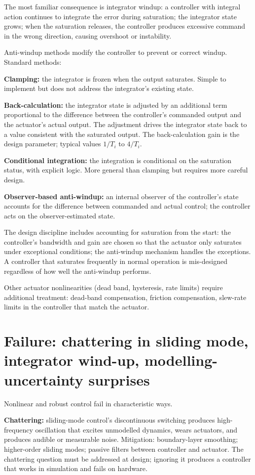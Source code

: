 The most familiar consequence is integrator windup: a controller with integral action continues to integrate the error during saturation; the integrator state grows; when the saturation releases, the controller produces excessive command in the wrong direction, causing overshoot or instability.

Anti-windup methods modify the controller to prevent or correct windup. Standard methods:

\textbf{Clamping:} the integrator is frozen when the output saturates. Simple to implement but does not address the integrator's existing state.

\textbf{Back-calculation:} the integrator state is adjusted by an additional term proportional to the difference between the controller's commanded output and the actuator's actual output. The adjustment drives the integrator state back to a value consistent with the saturated output. The back-calculation gain is the design parameter; typical values $1/T_i$ to $4/T_i$.

\textbf{Conditional integration:} the integration is conditional on the saturation status, with explicit logic. More general than clamping but requires more careful design.

\textbf{Observer-based anti-windup:} an internal observer of the controller's state accounts for the difference between commanded and actual control; the controller acts on the observer-estimated state.

The design discipline includes accounting for saturation from the start: the controller's bandwidth and gain are chosen so that the actuator only saturates under exceptional conditions; the anti-windup mechanism handles the exceptions. A controller that saturates frequently in normal operation is mis-designed regardless of how well the anti-windup performs.

Other actuator nonlinearities (dead band, hysteresis, rate limits) require additional treatment: dead-band compensation, friction compensation, slew-rate limits in the controller that match the actuator.

\section{Failure: chattering in sliding mode, integrator wind-up, modelling-uncertainty surprises}

Nonlinear and robust control fail in characteristic ways.

\textbf{Chattering:} sliding-mode control's discontinuous switching produces high-frequency oscillation that excites unmodelled dynamics, wears actuators, and produces audible or measurable noise. Mitigation: boundary-layer smoothing; higher-order sliding modes; passive filters between controller and actuator. The chattering question must be addressed at design; ignoring it produces a controller that works in simulation and fails on hardware.

